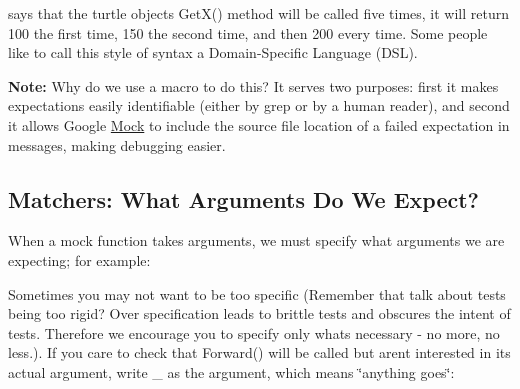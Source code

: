 \begin{DoxyCode}{0}
\end{DoxyCode}


says that the {\ttfamily turtle} object\textquotesingle{}s {\ttfamily Get\+X()} method will be called five times, it will return 100 the first time, 150 the second time, and then 200 every time. Some people like to call this style of syntax a Domain-\/\+Specific Language (D\+SL).

{\bfseries{Note\+:}} Why do we use a macro to do this? It serves two purposes\+: first it makes expectations easily identifiable (either by {\ttfamily grep} or by a human reader), and second it allows Google \mbox{\hyperlink{class_mock}{Mock}} to include the source file location of a failed expectation in messages, making debugging easier.

\subsection*{Matchers\+: What Arguments Do We Expect?}

When a mock function takes arguments, we must specify what arguments we are expecting; for example\+:


\begin{DoxyCode}{0}
\DoxyCodeLine{\textcolor{comment}{// Expects the turtle to move forward by 100 units.}}
\end{DoxyCode}


Sometimes you may not want to be too specific (Remember that talk about tests being too rigid? Over specification leads to brittle tests and obscures the intent of tests. Therefore we encourage you to specify only what\textquotesingle{}s necessary -\/ no more, no less.). If you care to check that {\ttfamily Forward()} will be called but aren\textquotesingle{}t interested in its actual argument, write {\ttfamily \+\_\+} as the argument, which means \char`\"{}anything goes\char`\"{}\+:


